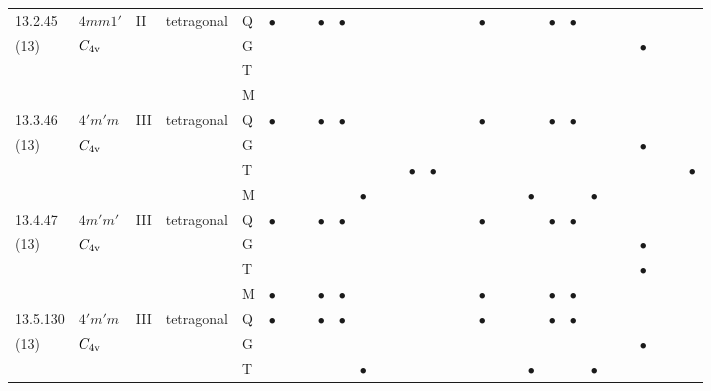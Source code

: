 \documentclass[fleqn,9pt,landscape]{jsarticle}
\begin{document}
\begin{longtable}{lllll|l|lll|ll|lll|l|lll|lll|l|ll|lll|lll}
13.2.45 & \texttt{$4mm1'$} & II & tetragonal & Q & $\bullet$ &  &  & $\bullet$ & $\bullet$ &  &  &  &  &  &  &  & $\bullet$ &  &  &  & $\bullet$ & $\bullet$ &  &  &  &  &  &  &  \\
(13) & $C_{\rm 4v}$ &  &  & G &  &  &  &  &  &  &  &  &  &  &  &  &  &  &  &  &  &  &  &  &  & $\bullet$ &  &  &  \\
 &  &  &  & T &  &  &  &  &  &  &  &  &  &  &  &  &  &  &  &  &  &  &  &  &  &  &  &  &  \\
 &  &  &  & M &  &  &  &  &  &  &  &  &  &  &  &  &  &  &  &  &  &  &  &  &  &  &  &  &  \\ \hline
13.3.46 & \texttt{$4'm'm$} & III & tetragonal & Q & $\bullet$ &  &  & $\bullet$ & $\bullet$ &  &  &  &  &  &  &  & $\bullet$ &  &  &  & $\bullet$ & $\bullet$ &  &  &  &  &  &  &  \\
(13) & $C_{\rm 4v}$ &  &  & G &  &  &  &  &  &  &  &  &  &  &  &  &  &  &  &  &  &  &  &  &  & $\bullet$ &  &  &  \\
 &  &  &  & T &  &  &  &  &  &  &  &  & $\bullet$ & $\bullet$ &  &  &  &  &  &  &  &  &  &  &  &  &  &  & $\bullet$ \\
 &  &  &  & M &  &  &  &  &  & $\bullet$ &  &  &  &  &  &  &  &  &  & $\bullet$ &  &  & $\bullet$ &  &  &  &  &  &  \\ \hline
13.4.47 & \texttt{$4m'm'$} & III & tetragonal & Q & $\bullet$ &  &  & $\bullet$ & $\bullet$ &  &  &  &  &  &  &  & $\bullet$ &  &  &  & $\bullet$ & $\bullet$ &  &  &  &  &  &  &  \\
(13) & $C_{\rm 4v}$ &  &  & G &  &  &  &  &  &  &  &  &  &  &  &  &  &  &  &  &  &  &  &  &  & $\bullet$ &  &  &  \\
 &  &  &  & T &  &  &  &  &  &  &  &  &  &  &  &  &  &  &  &  &  &  &  &  &  & $\bullet$ &  &  &  \\
 &  &  &  & M & $\bullet$ &  &  & $\bullet$ & $\bullet$ &  &  &  &  &  &  &  & $\bullet$ &  &  &  & $\bullet$ & $\bullet$ &  &  &  &  &  &  &  \\ \hline
13.5.130 & \texttt{$4'm'm$} & III & tetragonal & Q & $\bullet$ &  &  & $\bullet$ & $\bullet$ &  &  &  &  &  &  &  & $\bullet$ &  &  &  & $\bullet$ & $\bullet$ &  &  &  &  &  &  &  \\
(13) & $C_{\rm 4v}$ &  &  & G &  &  &  &  &  &  &  &  &  &  &  &  &  &  &  &  &  &  &  &  &  & $\bullet$ &  &  &  \\
 &  &  &  & T &  &  &  &  &  & $\bullet$ &  &  &  &  &  &  &  &  &  & $\bullet$ &  &  & $\bullet$ &  &  &  &  &  &  \\

\end{longtable}
\end{document}
